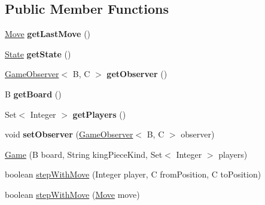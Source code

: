 \subsection*{Public Member Functions}
\begin{DoxyCompactItemize}
\item 
\hyperlink{classedu_1_1xwei12_1_1_chess_1_1_game_1_1_move}{Move} {\bfseries get\+Last\+Move} ()\hypertarget{classedu_1_1xwei12_1_1_chess_1_1_game_a92b8a1c86ecb185134542c2ee0549585}{}\label{classedu_1_1xwei12_1_1_chess_1_1_game_a92b8a1c86ecb185134542c2ee0549585}

\item 
\hyperlink{enumedu_1_1xwei12_1_1_chess_1_1_game_1_1_state}{State} {\bfseries get\+State} ()\hypertarget{classedu_1_1xwei12_1_1_chess_1_1_game_af413b5e964c0941228e7845a260f5f24}{}\label{classedu_1_1xwei12_1_1_chess_1_1_game_af413b5e964c0941228e7845a260f5f24}

\item 
\hyperlink{interfaceedu_1_1xwei12_1_1_chess_1_1_game_observer}{Game\+Observer}$<$ B, C $>$ {\bfseries get\+Observer} ()\hypertarget{classedu_1_1xwei12_1_1_chess_1_1_game_acfbd7c5c21548fac877a15754c62d83a}{}\label{classedu_1_1xwei12_1_1_chess_1_1_game_acfbd7c5c21548fac877a15754c62d83a}

\item 
B {\bfseries get\+Board} ()\hypertarget{classedu_1_1xwei12_1_1_chess_1_1_game_aa91b4872682497db5db623bc295145c6}{}\label{classedu_1_1xwei12_1_1_chess_1_1_game_aa91b4872682497db5db623bc295145c6}

\item 
Set$<$ Integer $>$ {\bfseries get\+Players} ()\hypertarget{classedu_1_1xwei12_1_1_chess_1_1_game_acabc73af5c50828887058d954bf2ee72}{}\label{classedu_1_1xwei12_1_1_chess_1_1_game_acabc73af5c50828887058d954bf2ee72}

\item 
void {\bfseries set\+Observer} (\hyperlink{interfaceedu_1_1xwei12_1_1_chess_1_1_game_observer}{Game\+Observer}$<$ B, C $>$ observer)\hypertarget{classedu_1_1xwei12_1_1_chess_1_1_game_a794fc5c9fb93e8cc50db32394d3716a0}{}\label{classedu_1_1xwei12_1_1_chess_1_1_game_a794fc5c9fb93e8cc50db32394d3716a0}

\item 
\hyperlink{classedu_1_1xwei12_1_1_chess_1_1_game_a73c44dc17b3d92649165a926c75a2aca}{Game} (B board, String king\+Piece\+Kind, Set$<$ Integer $>$ players)
\item 
boolean \hyperlink{classedu_1_1xwei12_1_1_chess_1_1_game_a63a7e5885a091656ff5cce4202eaed5d}{step\+With\+Move} (Integer player, C from\+Position, C to\+Position)
\item 
boolean \hyperlink{classedu_1_1xwei12_1_1_chess_1_1_game_a3bff3670cd72dbb08696eb3bee725adb}{step\+With\+Move} (\hyperlink{classedu_1_1xwei12_1_1_chess_1_1_game_1_1_move}{Move} move)
\end{DoxyCompactItemize}
